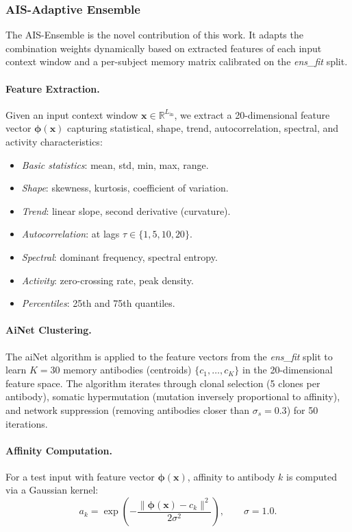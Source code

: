 \documentclass[11pt,a4paper]{article}
\begin{document}
\subsubsection{AIS-Adaptive Ensemble}
\label{ssec:ais}

The AIS-Ensemble is the novel contribution of this work.  It adapts the
combination weights dynamically based on extracted features of each input
context window and a per-subject memory matrix calibrated on the
\textit{ens\_fit} split.

\paragraph{Feature Extraction.}
Given an input context window $\mathbf{x}\in\mathbb{R}^{L_{\mathrm{in}}}$, we
extract a 20-dimensional feature vector $\boldsymbol{\phi}(\mathbf{x})$
capturing statistical, shape, trend, autocorrelation, spectral, and activity
characteristics:
\begin{itemize}[noitemsep]
  \item \textit{Basic statistics}: mean, std, min, max, range.
  \item \textit{Shape}: skewness, kurtosis, coefficient of variation.
  \item \textit{Trend}: linear slope, second derivative (curvature).
  \item \textit{Autocorrelation}: at lags $\tau\in\{1,5,10,20\}$.
  \item \textit{Spectral}: dominant frequency, spectral entropy.
  \item \textit{Activity}: zero-crossing rate, peak density.
  \item \textit{Percentiles}: 25th and 75th quantiles.
\end{itemize}

\paragraph{AiNet Clustering.}
The aiNet algorithm \cite{decastro2000} is applied to the feature vectors from
the \textit{ens\_fit} split to learn $K=30$ memory antibodies (centroids)
$\{c_1,\ldots,c_K\}$ in the 20-dimensional feature space.  The algorithm
iterates through clonal selection (5 clones per antibody), somatic
hypermutation (mutation inversely proportional to affinity), and network
suppression (removing antibodies closer than $\sigma_s=0.3$) for 50
iterations.

\paragraph{Affinity Computation.}
For a test input with feature vector $\boldsymbol{\phi}(\mathbf{x})$, affinity
to antibody $k$ is computed via a Gaussian kernel:
\begin{equation}
  a_k = \exp\!\left(-\frac{\|\boldsymbol{\phi}(\mathbf{x})-c_k\|^2}{2\sigma^2}\right),
  \qquad \sigma = 1.0.
\end{equation}
\end{document}
